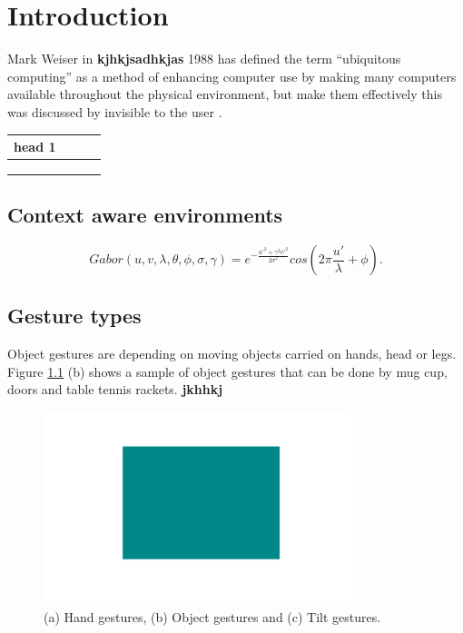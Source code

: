 \chapter{Introduction}

Mark Weiser in \textbf{kjhkjsadhkjas }1988 has defined the term ``ubiquitous computing'' as a method of enhancing computer use \cite{abc123} by making many computers available throughout the physical environment, but make them effectively this was discussed by  invisible to the user \cite{Weiser}.

\begin{tabular}{|c|c|c|c|}
\hline  head 1 &  &  &  \\ 
\hline  &  &  &  \\ 
\hline  &  &  &  \\ 
\hline  &  &  &  \\ 
\hline 
\end{tabular}  

\section{Context aware environments}

\begin{equation}
\label{gaboreqn}
Gabor(u,v,\lambda,\theta,\phi,\sigma,\gamma)=e^{-\frac{u'^{2}+
\gamma^{2}v'^{2}}{2\sigma^{2}}}cos(2\pi\frac{u'}{\lambda}+\phi).
\end{equation}



\section{Gesture types}

Object gestures are depending on moving objects carried on hands, head or legs. Figure \ref{fig:IntroTypeOfGestures} (b) shows a sample of object gestures that can be done by mug cup, doors and table tennis rackets.
\textbf{jkhhkj} 

\begin{figure}[tb]
\centering
\includegraphics[width=0.8\textwidth]{images/IntroTypeOfGestures.jpg}
\caption{(a) Hand gestures, (b) Object gestures and (c) Tilt gestures.}
\label{fig:IntroTypeOfGestures}
\end{figure}



